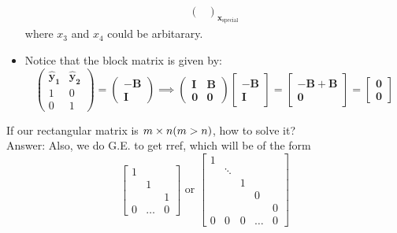 \begin{itemize}
\begin{align}
{\begin{pmatrix}
\end{pmatrix}}_{\bm x_{\text{special}}}
\end{align}                                          
where $x_3$ and $x_4$ could be arbitarary.
\item
Notice that the block matrix is given by:
\[\begin{pmatrix}
\bm{\hat y_1}&\bm{\hat y_2}\\1&0\\0&1
\end{pmatrix}
= \begin{pmatrix}
-\bm B\\\bm I
\end{pmatrix}\implies
\begin{pmatrix}
\bm I&\bm B\\\bm 0&\bm 0
\end{pmatrix}\begin{bmatrix}
-\bm B\\\bm I
\end{bmatrix} = \begin{bmatrix}
-\bm B+\bm B\\\bm 0
\end{bmatrix} = \begin{bmatrix}
\bm 0\\\bm 0
\end{bmatrix}
\]
\end{itemize}
If our rectangular matrix is $m\times n(m>n)$, how to solve it?\\
Answer: Also, we do G.E. to get rref, which will be of the form
\[
\begin{bmatrix}
1&&\\&1&\\&&1\\0&\dots&0
\end{bmatrix}\text{ or }\begin{bmatrix}
1& & & & \\
 &\ddots&&&\\
 & & 1&&\\
 &&&0&\\
 &&&&0\\0&0&0&\dots&0
\end{bmatrix}
\]
